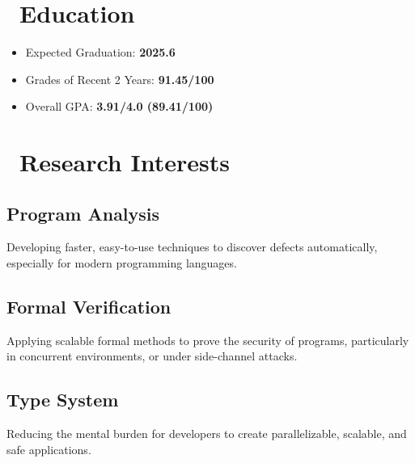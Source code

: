 \documentclass{resume}
\begin{document}


\section{\faGraduationCap\ Education}
\begin{itemize}
  \item Expected Graduation: \textbf{2025.6}
  \item Grades of Recent 2 Years: \textbf{91.45/100}
  \item Overall GPA: \textbf{3.91/4.0 (89.41/100)}
\end{itemize}


\section{\faLightbulbO\ Research Interests}
\subsection{\textbf{Program Analysis}}
Developing faster, easy-to-use techniques to discover defects automatically, especially for modern programming languages.

\subsection{\textbf{Formal Verification}}
Applying scalable formal methods to prove the security of programs, particularly in concurrent environments, or under side-channel attacks.

\subsection{\textbf{Type System}}
Reducing the mental burden for developers to create parallelizable, scalable, and safe applications.
\end{document}
